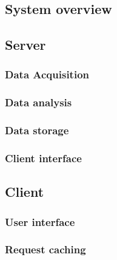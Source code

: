 
\subsection{System overview}

\subsection{Server}

\subsubsection{Data Acquisition}

\subsubsection{Data analysis}

\subsubsection{Data storage}

\subsubsection{Client interface}

\subsection{Client}

\subsubsection{User interface}

\subsubsection{Request caching}
